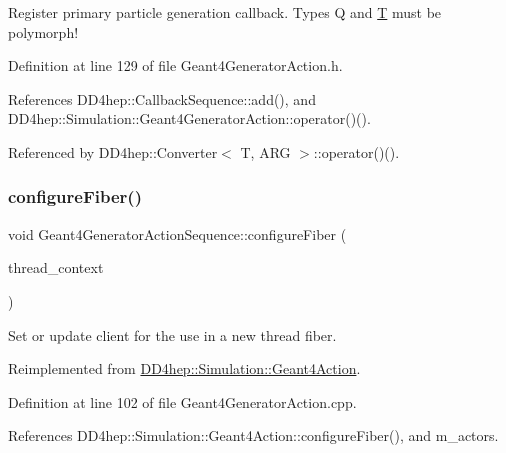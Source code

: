 Register primary particle generation callback. Types Q and \hyperlink{class_t}{T} must be polymorph! 



Definition at line 129 of file Geant4\+Generator\+Action.\+h.



References D\+D4hep\+::\+Callback\+Sequence\+::add(), and D\+D4hep\+::\+Simulation\+::\+Geant4\+Generator\+Action\+::operator()().



Referenced by D\+D4hep\+::\+Converter$<$ T, A\+R\+G $>$\+::operator()().

\hypertarget{class_d_d4hep_1_1_simulation_1_1_geant4_generator_action_sequence_a0ba4324a4f977eb12057e789eaf44f07}{}\label{class_d_d4hep_1_1_simulation_1_1_geant4_generator_action_sequence_a0ba4324a4f977eb12057e789eaf44f07} 
\subsubsection{\texorpdfstring{configure\+Fiber()}{configureFiber()}}
{\footnotesize\ttfamily void Geant4\+Generator\+Action\+Sequence\+::configure\+Fiber (\begin{DoxyParamCaption}\item[{\hyperlink{class_d_d4hep_1_1_simulation_1_1_geant4_context}{Geant4\+Context} $\ast$}]{thread\+\_\+context }\end{DoxyParamCaption})\hspace{0.3cm}{\ttfamily [virtual]}}



Set or update client for the use in a new thread fiber. 



Reimplemented from \hyperlink{class_d_d4hep_1_1_simulation_1_1_geant4_action_a6adc7138508303e4e417cb48a737ab19}{D\+D4hep\+::\+Simulation\+::\+Geant4\+Action}.



Definition at line 102 of file Geant4\+Generator\+Action.\+cpp.



References D\+D4hep\+::\+Simulation\+::\+Geant4\+Action\+::configure\+Fiber(), and m\+\_\+actors.

